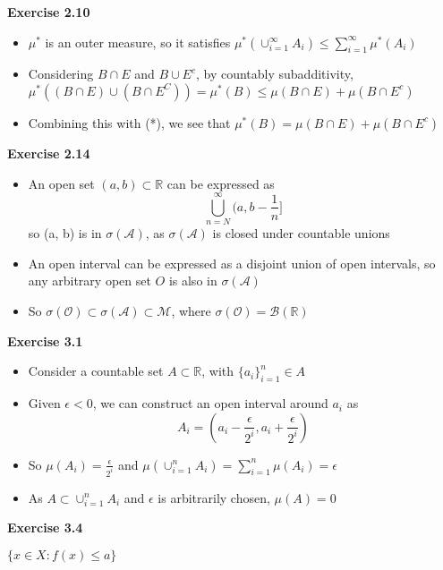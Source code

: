 \documentclass[letterpaper,12pt]{article}
\begin{document}
\textbf{Exercise 2.10}

\begin{itemize}
  \item $\mu^*$ is an outer measure, so it satisfies $\mu^*(\cup_{i=1}^\infty A_i) \leq \sum_{i=1}^\infty \mu^*(A_i)$
  \item Considering $B \cap E$ and $B \cup E^c$, by countably subadditivity, $\mu^*((B \cap E) \cup (B \cap E^C)) = \mu^*(B) \leq 
  \mu(B \cap E) + \mu(B \cap E^c)$
  \item Combining this with (*), we see that $\mu^*(B) = 
  \mu(B \cap E) + \mu(B \cap E^c)$
\end{itemize}

\textbf{Exercise 2.14}

\begin{itemize}
  \item An open set $(a, b) \subset \mathbb R$ can be expressed as
        $$
        \bigcup_{n=N}^{\infty} \Big(a, b - \frac{1}{n} \Big]
        $$
        so (a, b) is in $\sigma(\mathcal A)$, as $\sigma(\mathcal A)$ is closed under countable unions
  \item An open interval can be expressed as a disjoint union of open intervals, so any arbitrary open set $O$ is also in $\sigma(\mathcal A)$
  \item So $\sigma(\mathcal O) \subset \sigma(\mathcal A) \subset \mathcal M$, where $\sigma(\mathcal O) = \mathcal B(\mathbb R)$ 
\end{itemize}

\textbf{Exercise 3.1}

\begin{itemize}
  \item Consider a countable set $A \subset \mathbb R$, with $\{a_i\}_{i=1}^n \in A$
  \item Given $\epsilon < 0$, we can construct an open interval around $a_i$ as
        $$
        A_i = (a_i - \frac{\epsilon}{2^i}, a_i + \frac{\epsilon}{2^i})
        $$
  \item So $\mu(A_i) = \frac{\epsilon}{2^i}$ and $\mu(\cup_{i=1}^n A_i) = \sum_{i=1}^n \mu(A_i) = \epsilon$
  \item As $A \subset \cup_{i=1}^n A_i$ and $\epsilon$ is arbitrarily chosen, $\mu(A) = 0$
\end{itemize}

\textbf{Exercise 3.4}

$\{ x \in X: f(x) \leq a \}$
\end{document}
